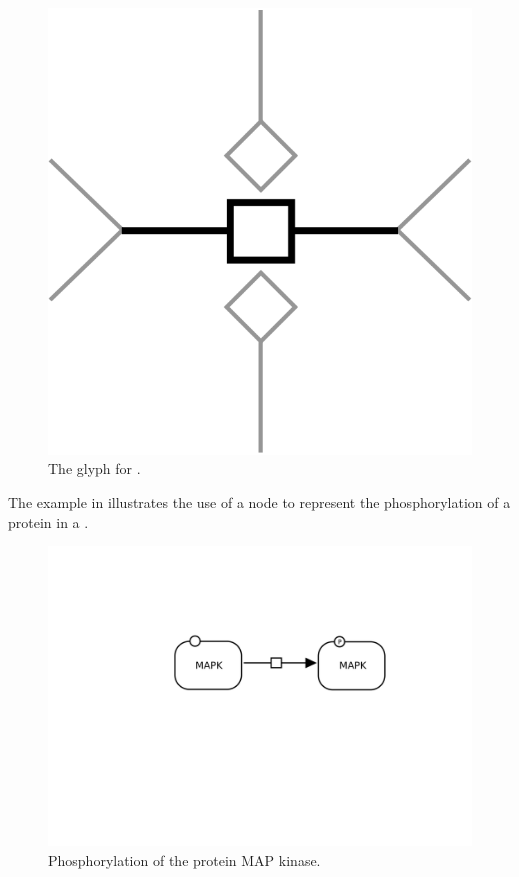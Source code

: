 \begin{figure}[htb]
  \centering
  \includegraphics[scale = 0.4]{images/process}
  \caption{The \PD glyph for .}
  \label{fig:techref:process}
\end{figure}


The example in  illustrates the use of a  node to represent the phosphorylation of a protein in a \PD.

\begin{figure}[htb]
  \centering
  \includegraphics[scale = 0.3]{examples/process-phosphorylation}
  \caption{Phosphorylation of the protein MAP kinase.}
  \label{fig:techref:trans-phos}
\end{figure}

